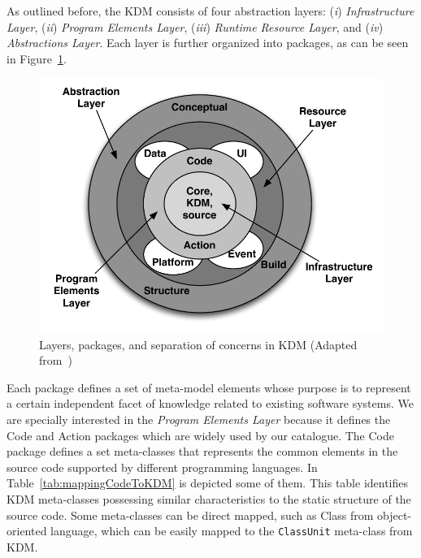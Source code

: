 \documentclass[12pt]{article}
\let\cite=\citep
\begin{document}
As outlined before, the KDM consists of four abstraction layers: (\textit{i}) \emph{Infrastructure Layer}, (\textit{ii}) \emph{Program Elements Layer}, (\textit{iii}) \emph{Runtime Resource Layer}, and (\textit{iv}) \emph{Abstractions Layer}. Each layer is further organized into packages, as can be seen in Figure~\ref{fig:layersKDM}. 
\begin{figure}[t]
\centering
  \includegraphics[scale=0.55]{Figure/Layers_packages_and_separations_of_concerns_in_KDM}
\caption{Layers, packages, and separation of concerns in KDM (Adapted from~\cite{OMGADM})}
\label{fig:layersKDM}
\end{figure}

Each package defines a set of meta-model elements whose purpose is to represent a certain independent facet of knowledge related to existing software systems.  We are specially interested in the \textit{Program Elements Layer} because it defines the Code and Action packages which are widely used by our catalogue. The Code package defines a set meta-classes that represents the common elements in the source code supported by different programming languages. In Table~\ref{tab:mappingCodeToKDM} is depicted some of them. This table identifies KDM meta-classes possessing similar characteristics to the static structure of the source code. Some meta-classes can be direct mapped, such as Class from object-oriented language, which can be easily mapped to the \texttt{ClassUnit} meta-class from KDM.
\end{document}
